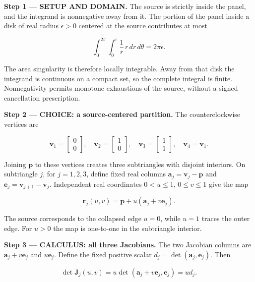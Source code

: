 \documentclass[11pt,oneside,openany]{book}
\begin{document}
\begin{DomainStep}
\textbf{Step 1 --- SETUP AND DOMAIN.} The source is strictly inside the panel, and the integrand is nonnegative away from it. The portion of the panel inside a disk of real radius \(\epsilon>0\) centered at the source contributes at most

\[
\int_0^{2\pi}\int_0^\epsilon\frac1r\,r\,dr\,d\theta=2\pi\epsilon.
\]

The area singularity is therefore locally integrable. Away from that disk the integrand is continuous on a compact set, so the complete integral is finite. Nonnegativity permits monotone exhaustions of the source, without a signed cancellation prescription.

\end{DomainStep}
\begin{ChoiceStep}
\textbf{Step 2 --- CHOICE: a source-centered partition.} The counterclockwise vertices are

\[
\mathbf v_1=\begin{bmatrix}0\\0\end{bmatrix},\quad
\mathbf v_2=\begin{bmatrix}1\\0\end{bmatrix},\quad
\mathbf v_3=\begin{bmatrix}1\\1\end{bmatrix},\quad
\mathbf v_4=\mathbf v_1.
\]

Joining \(\mathbf p\) to these vertices creates three subtriangles with disjoint interiors. On subtriangle \(j\), for \(j=1,2,3\), define fixed real columns \(\mathbf a_j=\mathbf v_j-\mathbf p\) and \(\mathbf e_j=\mathbf v_{j+1}-\mathbf v_j\). Independent real coordinates \(0<u\le1\), \(0\le v\le1\) give the map

\[
\mathbf r_j(u,v)=\mathbf p+u(\mathbf a_j+v\mathbf e_j).
\]

The source corresponds to the collapsed edge \(u=0\), while \(u=1\) traces the outer edge. For \(u>0\) the map is one-to-one in the subtriangle interior.

\end{ChoiceStep}
\textbf{Step 3 --- CALCULUS: all three Jacobians.} The two Jacobian columns are \(\mathbf a_j+v\mathbf e_j\) and \(u\mathbf e_j\). Define the fixed positive scalar \(d_j=\det(\mathbf a_j,\mathbf e_j)\). Then

\[
\det\mathbf J_j(u,v)
=u\det(\mathbf a_j+v\mathbf e_j,\mathbf e_j)=ud_j.
\]
\end{document}
